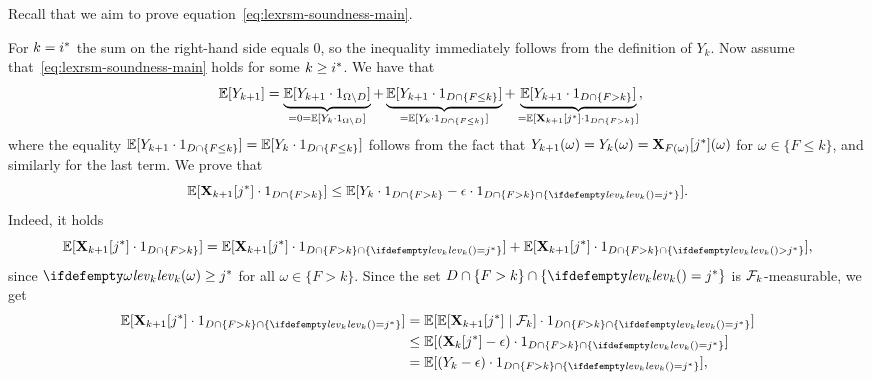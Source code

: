 Recall that we aim to prove equation~\eqref{eq:lexrsm-soundness-main}.

For 
$k={i}^*$ the sum on the right-hand side equals $0$, so the 
inequality immediately follows from the definition of $Y_k$. Now assume 
that~\eqref{eq:lexrsm-soundness-main} holds for some $k\geq {i}^*$. We have that 
\begin{align}
\label{eq:lexrsm-ind-1}
\mathbb{E}[Y_{k+1}] &= \underbrace{\mathbb{E}[Y_{k+1}\cdot {1}_{\Omega\setminus D}]}_{=0=\mathbb{E}[Y_k\cdot{1}_{\Omega\setminus D}]} +  \underbrace{\mathbb{E}[Y_{k+1}\cdot {1}_{D \cap \{F \leq k\}}]}_{=\mathbb{E}[Y_k\cdot{1}_{D\cap \{F\leq k\}}]} + \underbrace{\mathbb{E}[Y_{k+1}\cdot {1}_{D \cap \{F > k\}}]}_{=\mathbb{E}[\mathbf{X}_{k+1}[{j}^*]\cdot{1}_{D\cap \{F>k \} }]},
\end{align}
where the equality $\mathbb{E}[Y_{k+1}\cdot {1}_{D \cap \{F \leq k\}}] =\mathbb{E}[Y_k\cdot{1}_{D\cap \{F\leq k\}}] $ follows from the fact that $Y_{k+1}(\omega)=Y_k({\omega})=\mathbf{X}_{F(\omega)}[{j}^*](\omega)$ for $\omega\in \{F\leq k\}$, and similarly for the last term. We prove that 
\begin{equation}
\label{eq:lexrsm-ind-2}
\E[\vecseq{X}{k+1}{\fixn{j}}\cdot \indicator{D\cap \{F > k \}}] \leq \E[Y_k\cdot \indicator{D\cap \{F > k \}} -\eps\cdot \indicator{D\cap \{F>k\} \cap \{\levelrank{}{k}= \fixn{j}\} }] .
\end{equation}
Indeed, it holds
\begin{equation}
\label{eq:lexrsm-ind-3}
\E[\vecseq{X}{k+1}{\fixn{j}}\cdot \indicator{D\cap \{F > k \}}] = \E[\vecseq{X}{k+1}{\fixn{j}}\cdot \indicator{D\cap \{F > k \} \cap \{\levelrank{}{k}=\fixn{j} \} }]  + \E[\vecseq{X}{k+1}{\fixn{j}}\cdot \indicator{D\cap \{F > k \} \cap \{\levelrank{}{k}>\fixn{j}\} }], 
\end{equation}
since $\levelrank{\omega}{k}\geq \fixn{j}$ for all $\omega \in \{F>k\}$. Since the set $D\cap \{F > k \} \cap \{\levelrank{}{k}=\fixn{j} \}$ is $\mathcal{F}_k$-measurable, we get
\begin{align}
\E[\vecseq{X}{k+1}{\fixn{j}}\cdot \indicator{D\cap \{F > k \} \cap \{\levelrank{}{k}=\fixn{j} \} }] &= \E[\E[\vecseq{X}{k+1}{\fixn{j}}\mid \genfilt_k]\cdot \indicator{D\cap \{F > k \} \cap \{\levelrank{}{k}=\fixn{j} \} }] \label{eq:lexrsm-ind-4}\\
&\leq \E[(\vecseq{X}{k}{\fixn{j}} - \eps)\cdot \indicator{D\cap \{F > k \} \cap \{\levelrank{}{k}=\fixn{j} \}}] \label{eq:lexrsm-ind-5}\\
&=\E[(Y_k - \eps)\cdot \indicator{D\cap \{F > k \} \cap \{\levelrank{}{k}=\fixn{j} \}}] \label{eq:lexrsm-ind-6},
\end{align}
